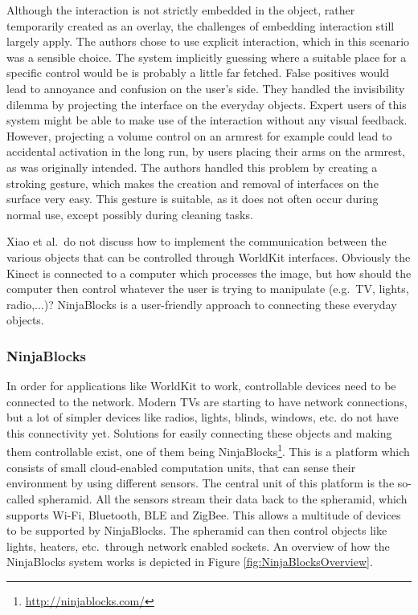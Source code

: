 Although the interaction is not strictly embedded in the object, rather temporarily created as an overlay, the challenges of embedding interaction still largely apply.
The authors chose to use explicit interaction, which in this scenario was a sensible choice.
The system implicitly guessing where a suitable place for a specific control would be is probably a little far fetched. 
False positives would lead to annoyance and confusion on the user's side.
They handled the invisibility dilemma by projecting the interface on the everyday objects.
Expert users of this system might be able to make use of the interaction without any visual feedback. However, projecting a volume control on an armrest for example could lead to accidental activation in the long run, by users placing their arms on the armrest, as was originally intended.
The authors handled this problem by creating a stroking gesture, which makes the creation and removal of interfaces on the surface very easy.
This gesture is suitable, as it does not often occur during normal use, except possibly during cleaning tasks.

Xiao et al.\ do not discuss how to implement the communication between the various objects that can be controlled through WorldKit interfaces.
Obviously the Kinect is connected to a computer which processes the image, but how should the computer then control whatever the user is trying to manipulate (e.g.\ TV, lights, radio,...)?
NinjaBlocks is a user-friendly approach to connecting these everyday objects.

\subsubsection{NinjaBlocks}
\label{sec:ninjaBlocks}
In order for applications like WorldKit to work, controllable devices need to be connected to the network.
Modern TVs are starting to have network connections, but a lot of simpler devices like radios, lights, blinds, windows, etc. do not have this connectivity yet.
Solutions for easily connecting these objects and making them controllable exist, one of them being NinjaBlocks\footnote{\url{http://ninjablocks.com/}}.
This is a platform which consists of small cloud-enabled computation units, that can sense their environment by using different sensors. 
The central unit of this platform is the so-called spheramid.
All the sensors stream their data back to the spheramid, which supports Wi-Fi, Bluetooth, BLE and ZigBee.
This allows a multitude of devices to be supported by NinjaBlocks.
The spheramid can then control objects like lights, heaters, etc.\ through network enabled sockets. An overview of how the NinjaBlocks system works is depicted in Figure \ref{fig:NinjaBlocksOverview}.

